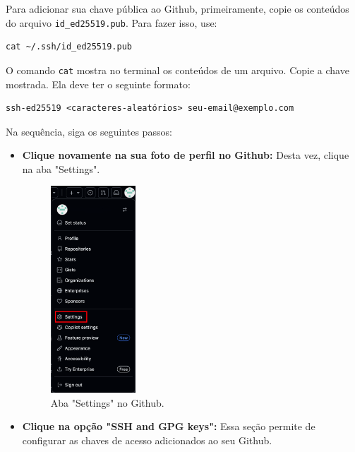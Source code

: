 Para adicionar sua chave pública ao Github, primeiramente, copie os conteúdos do arquivo \texttt{id\_ed25519.pub}. Para fazer isso, use:

\begin{lstlisting}[style=shellstyle]
cat ~/.ssh/id_ed25519.pub
\end{lstlisting}

O comando \texttt{cat} mostra no terminal os conteúdos de um arquivo. Copie a chave mostrada. Ela deve ter o seguinte formato:

\begin{lstlisting}[style=shellstyle]
ssh-ed25519 <caracteres-aleatórios> seu-email@exemplo.com
\end{lstlisting}

Na sequência, siga os seguintes passos:

\begin{itemize}
    \item \textbf{Clique novamente na sua foto de perfil no Github:}
    Desta vez, clique na aba "Settings".

\begin{figure}[H]
\centering
\includegraphics[width=0.3\textwidth]{imgs/tutorial_criar_conta_github/7_settings.png}
\caption{Aba "Settings" no Github.}
\label{fig:aba_settings}
\end{figure}

\item \textbf{Clique na opção "SSH and GPG keys":}
Essa seção permite de configurar as chaves de acesso adicionados ao seu Github.


\end{itemize}
